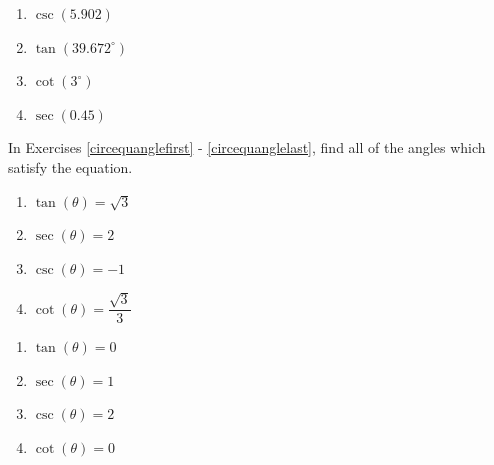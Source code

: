 \begin{multicols}{4}

\begin{enumerate}

\setcounter{enumi}{\value{HW}}

\item $\csc(5.902)$
\item $\tan(39.672^{\circ})$
\item $\cot(3^{\circ})$
\item $\sec(0.45)$ \label{circcalclast}

\setcounter{HW}{\value{enumi}}

\end{enumerate}

\end{multicols}

\pagebreak 

In Exercises \ref{circequanglefirst} - \ref{circequanglelast}, find all of the angles which satisfy the equation.

\begin{multicols}{4}

\begin{enumerate}

\setcounter{enumi}{\value{HW}}

\item $\tan(\theta) = \sqrt{3}$  \label{circequanglefirst}
\item $\sec(\theta) = 2$ 
\item $\csc(\theta) = -1$ 
\item $\cot(\theta) = \dfrac{\sqrt{3}}{3}$

\setcounter{HW}{\value{enumi}}

\end{enumerate}

\end{multicols}

\begin{multicols}{4}

\begin{enumerate}

\setcounter{enumi}{\value{HW}}

\item $\tan(\theta) = 0$
\item $\sec(\theta) = 1$
\item $\csc(\theta) = 2$
\item $\cot(\theta) = 0$

\setcounter{HW}{\value{enumi}}

\end{enumerate}

\end{multicols}

